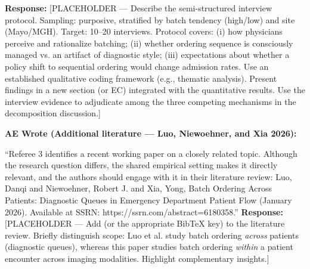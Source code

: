 \documentclass[11pt]{article}
\newenvironment{quote2}
{ \bigskip
\noindent
         \small\em
         \baselineskip=14pt
}
\newcommand{\1}{\hbox{\rm 1\kern-.35em 1}}
\begin{document}
\noindent\textbf{Response:} \color{blue}[PLACEHOLDER --- Describe the semi-structured interview protocol. Sampling: purposive, stratified by batch tendency (high/low) and site (Mayo/MGH). Target: 10--20 interviews. Protocol covers: (i) how physicians perceive and rationalize batching; (ii) whether ordering sequence is consciously managed vs. an artifact of diagnostic style; (iii) expectations about whether a policy shift to sequential ordering would change admission rates. Use an established qualitative coding framework (e.g., thematic analysis). Present findings in a new section (or EC) integrated with the quantitative results. Use the interview evidence to adjudicate among the three competing mechanisms in the decomposition discussion.]
\color{black}

\begin{quote2}
\textbf{AE Wrote (Additional literature --- Luo, Niewoehner, and Xia 2026):}

\noindent ``Referee 3 identifies a recent working paper on a closely related topic. Although the research question differs, the shared empirical setting makes it directly relevant, and the authors should engage with it in their literature review: Luo, Danqi and Niewoehner, Robert J. and Xia, Yong, Batch Ordering Across Patients: Diagnostic Queues in Emergency Department Patient Flow (January 2026). Available at SSRN: https://ssrn.com/abstract=6180358.''
\end{quote2}

\noindent\textbf{Response:} \color{blue}[PLACEHOLDER --- Add \citet{luo2026batch} (or the appropriate BibTeX key) to the literature review. Briefly distinguish scope: Luo et al. study batch ordering \textit{across} patients (diagnostic queues), whereas this paper studies batch ordering \textit{within} a patient encounter across imaging modalities. Highlight complementary insights.]
\color{black}
\end{document}
